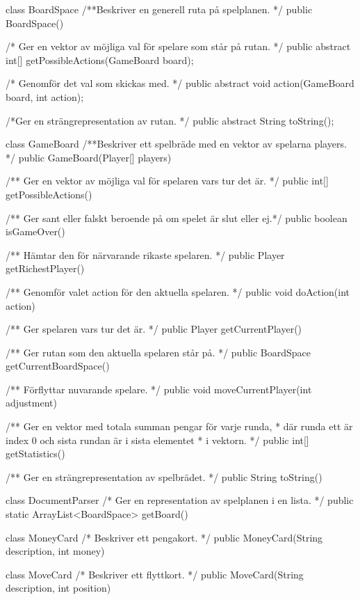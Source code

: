 \begin{JavaSpec}{class BoardSpace}
/**Beskriver en generell ruta på spelplanen. */
public BoardSpace()

/* Ger en vektor av möjliga val för spelare som står på rutan. */
public abstract int[] getPossibleActions(GameBoard board);

/* Genomför det val som skickas med. */
public abstract void action(GameBoard board, int action);

/*Ger en strängrepresentation av rutan. */
public abstract String toString();
\end{JavaSpec}

\begin{JavaSpec}{class GameBoard}
/**Beskriver ett spelbräde med en vektor av spelarna players. */
public GameBoard(Player[] players) 

/** Ger en vektor av möjliga val för spelaren vars tur det är. */
public int[] getPossibleActions()

/** Ger sant eller falskt beroende på om spelet är slut eller ej.*/
public boolean isGameOver()

/** Hämtar den för närvarande rikaste spelaren. */
public Player getRichestPlayer()

/** Genomför valet action för den aktuella spelaren. */
public void doAction(int action)

/** Ger spelaren vars tur det är. */
public Player getCurrentPlayer()

/** Ger rutan som den aktuella spelaren står på. */
public BoardSpace getCurrentBoardSpace()

/** Förflyttar nuvarande spelare. */
public void moveCurrentPlayer(int adjustment)

/** Ger en vektor med totala summan pengar för varje runda,
 * där runda ett är index 0 och sista rundan är i sista elementet 
 * i vektorn.  */
public int[] getStatistics()

/** Ger en strängrepresentation av spelbrädet. */
public String toString()
\end{JavaSpec}

\begin{JavaSpec}{class DocumentParser}
/* Ger en representation av spelplanen i en lista. */
public static ArrayList<BoardSpace> getBoard()
\end{JavaSpec}

\begin{JavaSpec}{class MoneyCard}
/* Beskriver ett pengakort. */
public MoneyCard(String description, int money)
\end{JavaSpec}
\begin{JavaSpec}{class MoveCard}
/* Beskriver ett flyttkort. */
public MoveCard(String description, int position)
\end{JavaSpec}

